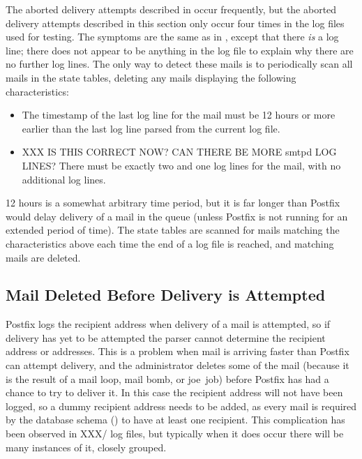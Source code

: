 \label{yet-more-aborted-delivery-attempts}

The aborted delivery attempts described in
 occur frequently, but the aborted
delivery attempts described in this section only occur four times in the
\numberOFlogFILES{} log files used for testing.  The symptoms are the same
as in , except that there
\textit{is\/} a  log line; there does not appear to be
anything in the log file to explain why there are no further log lines.
The only way to detect these mails is to periodically scan all mails in the
state tables, deleting any mails displaying the following characteristics:

\begin{itemize}

    \item The timestamp of the last log line for the mail must be 12 hours
        or more earlier than the last log line parsed from the current log
        file.

    \item XXX IS THIS CORRECT NOW\@?  CAN THERE BE MORE smtpd LOG LINES\@?
        There must be exactly two  and one 
        log lines for the mail, with no additional log lines.

\end{itemize}

12 hours is a somewhat arbitrary time period, but it is far longer than
Postfix would delay delivery of a mail in the queue (unless Postfix is not
running for an extended period of time).  The state tables are scanned for
mails matching the characteristics above each time the end of a log file is
reached, and matching mails are deleted.

\subsection{Mail Deleted Before Delivery is Attempted}

\label{Mail deleted before delivery is attempted}

Postfix logs the recipient address when delivery of a mail is attempted, so
if delivery has yet to be attempted the parser cannot determine the
recipient address or addresses.  This is a problem when mail is arriving
faster than Postfix can attempt delivery, and the administrator deletes
some of the mail (because it is the result of a mail loop, mail bomb, or joe~job) before
Postfix has had a chance to try to deliver it.  In this case the recipient
address will not have been logged, so a dummy recipient address needs to be
added, as every mail is required by the database schema
() to have at least one recipient.  This
complication has been observed in XXX/\numberOFlogFILES{} log files, but
typically when it does occur there will be many instances of it, closely
grouped.

